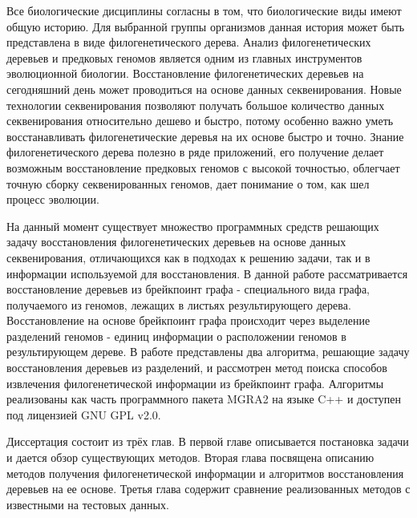 \intro

Все биологические дисциплины согласны в том, что биологические виды имеют общую историю.
Для выбранной группы организмов данная история может быть представлена в виде филогенетического дерева.
Анализ филогенетических деревьев и предковых геномов является одним из главных инструментов эволюционной биологии.
Восстановление филогенетических деревьев на сегодняшний день может проводиться на основе данных секвенирования.
Новые технологии секвенирования позволяют получать большое количество данных секвенирования относительно дешево и быстро,
потому особенно важно уметь восстанавливать филогенетические деревья на их основе быстро и точно.
Знание филогенетического дерева полезно в ряде приложений, его получение делает возможным восстановление предковых геномов с высокой точностью,
облегчает точную сборку секвенированных геномов, дает понимание о том, как шел процесс эволюции.

На данный момент существует множество программных средств решающих задачу восстановления филогенетических деревьев на основе данных
секвенирования, отличающихся как в подходах к решению задачи, так и в информации используемой для восстановления.
В данной работе рассматривается восстановление деревьев из брейкпоинт графа - специального вида графа, получаемого из геномов, лежащих в листьях результирующего дерева.
Восстановление на основе брейкпоинт графа происходит через выделение разделений геномов - единиц информации о расположении геномов в результирующем дереве.
В работе представлены два алгоритма, решающие задачу восстановления деревьев из разделений,
и рассмотрен метод поиска способов извлечения филогенетической информации из брейкпоинт графа.
Алгоритмы реализованы как часть программного пакета MGRA2 на языке C++ и доступен под лицензией GNU GPL v2.0.

Диссертация состоит из трёх глав.
В первой главе описывается постановка задачи и дается обзор существующих методов.
Вторая глава посвящена описанию методов получения филогенетической информации и алгоритмов восстановления деревьев на ее основе.
Третья глава содержит сравнение реализованных методов с известными на тестовых данных.
